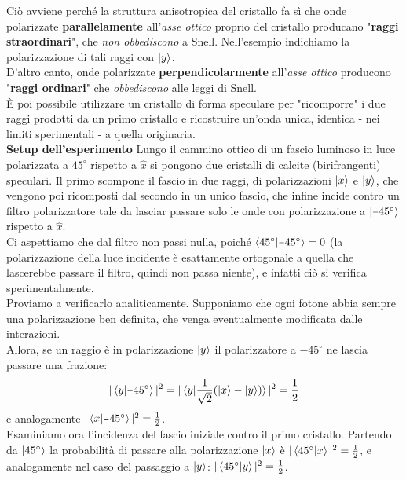 \documentclass[FisicaTeorica.tex]{subfiles}
\begin{document}
Ciò avviene perché la struttura anisotropica del cristallo fa sì che onde polarizzate \textbf{parallelamente} all'\textit{asse ottico} proprio del cristallo producano "\textbf{raggi straordinari}", che \textit{non obbediscono} a Snell. Nell'esempio indichiamo la polarizzazione di tali raggi con $\ket{y}$.\\
D'altro canto, onde polarizzate \textbf{perpendicolarmente} all'\textit{asse ottico} producono "\textbf{raggi ordinari}" che \textit{obbediscono} alle leggi di Snell.\\
È poi possibile utilizzare un cristallo di forma speculare per "ricomporre" i due raggi prodotti da un primo cristallo e ricostruire un'onda unica, identica - nei limiti sperimentali - a quella originaria.\\
\textbf{Setup dell'esperimento}  Lungo il cammino ottico di un fascio luminoso in luce polarizzata a $45^\circ$ rispetto a $\hat{x}$ si pongono due cristalli di calcite (birifrangenti) speculari. Il primo scompone il fascio in due raggi, di polarizzazioni $\ket{x}$ e $\ket{y}$, che vengono poi ricomposti dal secondo in un unico fascio, che infine incide contro un filtro polarizzatore tale da lasciar passare solo le onde con polarizzazione a $\ket{\minus 45^\circ}$ rispetto a $\hat{x}$.\\
Ci aspettiamo che dal filtro non passi nulla, poiché $\braket{45^\circ|\minus 45^\circ} = 0$ (la polarizzazione della luce incidente è esattamente ortogonale a quella che lascerebbe passare il filtro, quindi non passa niente), e infatti ciò si verifica sperimentalmente.\\
Proviamo a verificarlo analiticamente. Supponiamo che ogni fotone abbia sempre una polarizzazione ben definita, che venga eventualmente modificata dalle interazioni.\\
Allora, se un raggio è in polarizzazione $\ket{y}$ il polarizzatore a $\minus 45^\circ$ ne lascia passare una frazione:
\[
|\braket{y|\minus 45^\circ} |^2 = |\braket{y|\frac{1}{\sqrt{2}}(\ket{x}-\ket{y})}|^2 = \frac{1}{2} 
\]
e analogamente $|\braket{x|\minus 45^\circ}|^2 = \frac{1}{2}$.\\
Esaminiamo ora l'incidenza del fascio iniziale contro il primo cristallo. Partendo da $\ket{45^\circ}$ la probabilità di passare alla polarizzazione $\ket{x}$ è $|\braket{45^\circ |x}|^2 = \frac{1}{2}$, e analogamente nel caso del passaggio a $\ket{y}$: $|\braket{45^\circ|y}|^2=\frac{1}{2}$.\\
\end{document}
